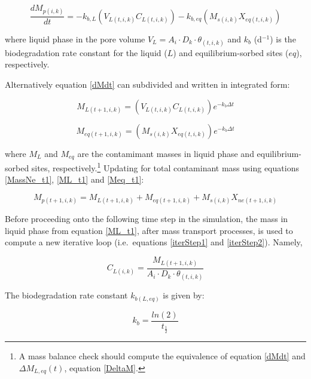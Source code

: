 \documentclass[]{article}
\let\rmarkdownfootnote\footnote%
\def\footnote{\protect\rmarkdownfootnote}
\begin{document}
\begin{equation} 
\frac{dM_{p(i,k)}}{dt} = -k_{b,L}(V_{L(t,i,k)}C_{L(t,i,k)})-k_{b,eq}(M_{s(i,k)}X_{eq(t,i,k)})
\label{eq:dMdt}
\end{equation}

where liquid phase in the pore volume
\(V_L = A_i \cdot D_k\cdot \theta_{(t,i,k)}\) and \(k_{b}\) (d\(^{-1}\))
is the biodegradation rate constant for the liquid (\(L\)) and
equilibrium-sorbed sites (\(eq\)), respectively.

Alternatively equation \eqref{dMdt} can subdivided and written in
integrated form:

\begin{equation}
M_{L(t+1,i,k)} = (V_{L(t,i,k)}C_{L(t,i,k)})e^{-k_{b} \Delta t} 
\label{eq:ML_t1}
\end{equation}

\begin{equation}
M_{eq(t+1,i,k)} = (M_{s(i,k)}X_{eq(t,i,k)})e^{-k_{b} \Delta t}
\label{eq:Meq_t1}
\end{equation}

where \(M_{L}\) and \(M_{eq}\) are the contamimant masses in liquid
phase and equilibrium-sorbed sites,
respectively.\footnote{A mass balance check should compute the equivalence of equation \eqref{dMdt} and $\Delta M_{L,eq}(t)$, equation \eqref{DeltaM}.}
Updating for total contaminant mass using equations \eqref{MassNe_t1},
\eqref{ML_t1} and \eqref{Meq_t1}:

\begin{equation}
M_{p(t+1,i,k)} = M_{L(t+1,i,k)} + M_{eq(t+1,i,k)} + M_{s(i,k)}X_{ne(t+1,i,k)}
\label{eq:totmass_t1}
\end{equation}

Before proceeding onto the following time step in the simulation, the
mass in liquid phase from equation \eqref{ML_t1}, after mass transport
processes, is used to compute a new iterative loop (i.e.~equations
\eqref{iterStep1} and \eqref{iterStep2}). Namely,

\begin{equation}
C_{L(i,k)} = \frac{M_{L(t+1,i,k)}}{A_i \cdot D_k \cdot \theta_{(t,i,k)}} 
\label{eq:C_Lnew}
\end{equation}

The biodegradation rate constant \(k_{b(L,eq)}\) is given by:

\begin{equation}
k_b = \frac{ln(2)}{t_\frac{1}{2}} 
\label{eq:k_b}
\end{equation}
\end{document}

